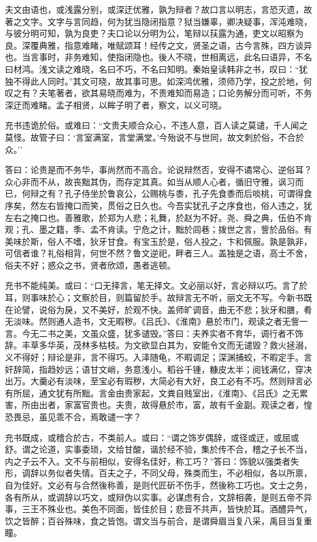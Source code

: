\documentclass[]{article}
\begin{document}
夫文由语也，或浅露分别，或深迂优雅，孰为辩者？故口言以明志，言恐灭遗，故著之文字。文字与言同趋，何为犹当隐闭指意？狱当嫌辜，卿决疑事，浑沌难晓，与彼分明可知，孰为良吏？夫口论以分明为公，笔辩以荴露为通，吏文以昭察为良。深覆典雅，指意难睹，唯赋颂耳！经传之文，贤圣之语，古今言殊，四方谈异也。当言事时，非务难知，使指闭隐也。後人不晓，世相离远，此名曰语异，不名曰材鸿。浅文读之难晓，名曰不巧，不名曰知明。秦始皇读韩非之书，叹曰：``犹独不得此人同时。''其文可晓，故其事可思。如深鸿优雅，须师乃学，投之於地，何叹之有？夫笔著者，欲其易晓而难为，不贵难知而易造；口论务解分而可听，不务深迂而难睹。孟子相贤，以眸子明了者，察文，以义可晓。

充书违诡於俗。或难曰：``文贵夫顺合众心，不违人意，百人读之莫谴，千人闻之莫怪。故管子曰：`言室满室，言堂满堂。'今殆说不与世同，故文刺於俗，不合於众。''

答曰：论贵是而不务华，事尚然而不高合。论说辩然否，安得不谲常心、逆俗耳？众心非而不从，故丧黜其伪，而存定其真。如当从顺人心者，循旧守雅，讽习而已，何辩之有？孔子侍坐於鲁哀公，公赐桃与黍，孔子先食黍而后啖桃，可谓得食序矣，然左右皆掩口而笑，贯俗之日久也。今吾实犹孔子之序食也，俗人违之，犹左右之掩口也。善雅歌，於郑为人悲；礼舞，於赵为不好。尧、舜之典，伍伯不肯观；孔、墨之籍，季、孟不肯读。宁危之计，黜於闾巷；拨世之言，訾於品俗。有美味於斯，俗人不嗜，狄牙甘食。有宝玉於是，俗人投之，卞和佩服。孰是孰非，可信者谁？礼俗相背，何世不然？鲁文逆祀，畔者三人。盖独是之语，高士不舍，俗夫不好；惑众之书，贤者欣颂，愚者逃顿。

充书不能纯美。或曰：``口无择言，笔无择文。文必丽以好，言必辩以巧。言了於耳，则事味於心；文察於目，则篇留於手。故辩言无不听，丽文无不写。今新书既在论譬，说俗为戾，又不美好，於观不快。盖师旷调音，曲无不悲；狄牙和膳，肴无淡味。然则通人造书，文无暇秽。《吕氏》、《淮南》悬於市门，观读之者无訾一言。今无二书之美，文虽众盛，犹多谴毁。''答曰：夫养实者不育华，调行者不饰辞。丰草多华英，茂林多枯枝。为文欲显白其为，安能令文而无谴毁？救火拯溺，义不得好；辩论是非，言不得巧。入泽随龟，不暇调足；深渊捕蛟，不暇定手。言奸辞简，指趋妙远；语甘文峭，务意浅小。稻谷千锺，糠皮太半；阅钱满亿，穿决出万。大羹必有淡味，至宝必有瑕秽，大简必有大好，良工必有不巧。然则辩言必有所屈，通文犹有所黜。言金由贵家起，文粪自贱室出，《淮南》、《吕氏》之无累害，所由出者，家富官贵也。夫贵，故得悬於市，富，故有千金副。观读之者，惶恐畏忌，虽见乖不合，焉敢谴一字？

充书既成，或稽合於古，不类前人。或曰：``谓之饰岁偶辞，或径或迂，或屈或舒。谓之论道，实事委琐，文给甘酸，谐於经不验，集於传不合，稽之子长不当，内之子云不入。文不与前相似，安得名佳好，称工巧？''答曰：饰貌以强类者失形，调辞以务似者失情。百夫之子，不同父母，殊类而生，不必相似，各以所禀，自为佳好。文必有与合然後称善，是则代匠斫不伤手，然後称工巧也。文士之务，各有所从，或调辞以巧文，或辩伪以实事。必谋虑有合，文辞相袭，是则五帝不异事，三王不殊业也。美色不同面，皆佳於目；悲音不共声，皆快於耳。酒醴异气，饮之皆醉；百谷殊味，食之皆饱。谓文当与前合，是谓舜眉当复八采，禹目当复重瞳。
\end{document}

